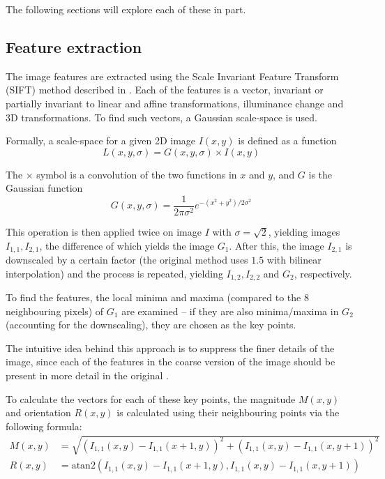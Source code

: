 The following sections will explore each of these in part.

\subsection{Feature extraction}
The image features are extracted using the Scale Invariant Feature Transform (SIFT) method described in \citet{lowe1999object,lowe2004distinctive,snavely2008modeling}.
Each of the features is a vector, invariant or partially invariant to linear and affine transformations, illuminance change and 3D transformations.
To find such vectors, a Gaussian scale-space is used.

Formally, a scale-space for a given 2D image $I(x, y)$ is defined as a function
$$L(x, y, \sigma) = G(x, y, \sigma) \times I(x, y)$$

The $\times$ symbol is a convolution of the two functions in $x$ and $y$, and $G$ is the Gaussian function
$$G(x, y, \sigma) = \frac{1}{2\pi \sigma^2} e^{-(x^2 + y^2) / 2\sigma^2}$$

This operation is then applied twice on image $I$ with $\sigma = \sqrt{2}$, yielding images $I_{1,1}, I_{2,1}$, the difference of which yields the image $G_1$.
After this, the image $I_{2,1}$ is downscaled by a certain factor (the original method uses $1.5$ with bilinear interpolation) and the process is repeated, yielding $I_{1,2}, I_{2,2}$ and $G_2$, respectively.

To find the features, the local minima and maxima (compared to the 8 neighbouring pixels) of $G_1$ are examined -- if they are also minima/maxima in $G_2$ (accounting for the downscaling), they are chosen as the key points.

The intuitive idea behind this approach is to suppress the finer details of the image, since each of the features in the coarse version of the image should be present in more detail in the original \cite{scalespace}.

To calculate the vectors for each of these key points, the magnitude $M(x,y)$ and orientation $R(x,y)$ is calculated using their neighbouring points via the following formula:
$$
\begin{aligned}
	M(x,y) &= \sqrt{\left(I_{1,1}(x, y) - I_{1,1}(x + 1, y)\right)^2 + \left(I_{1,1}(x,y) - I_{1,1}(x, y + 1)\right)^2} \\[0.7em]
	R(x,y) &= \mathrm{atan2} \left(I_{1,1}(x, y) - I_{1,1}(x + 1, y), I_{1,1}(x,y) - I_{1,1}(x, y + 1)\right)
\end{aligned}
$$

